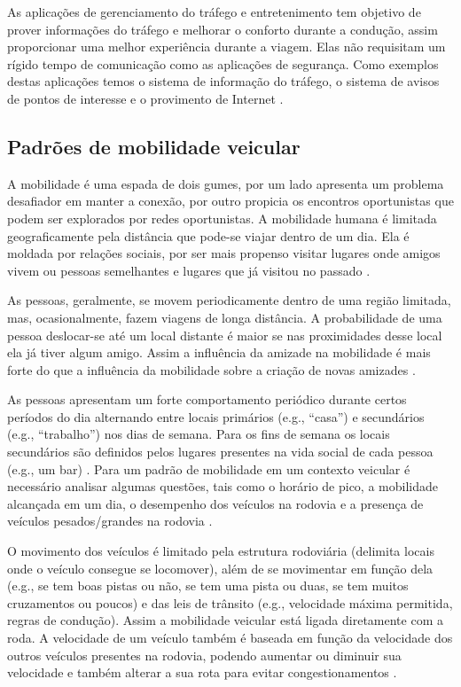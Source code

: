 \documentclass[mestrado, pre-defesa, english, brazil]{packages/icmc}
\begin{document}
As aplicações de gerenciamento do tráfego e entretenimento tem objetivo de prover informações do tráfego e melhorar o conforto durante a condução, assim proporcionar uma melhor experiência durante a viagem. Elas não requisitam um rígido tempo de comunicação como as aplicações de segurança. Como exemplos destas aplicações temos o sistema de informação do tráfego, o sistema de avisos de pontos de interesse e o provimento de Internet \cite{Soomro-2010,aboobaker-2010,Yokoyama-2014}.

\subsection{Padrões de mobilidade veicular} \label{pmv}

A mobilidade é uma espada de dois gumes, por um lado apresenta um problema desafiador em manter a conexão, por outro propicia os encontros oportunistas que podem ser explorados por redes oportunistas. A mobilidade humana é limitada geograficamente pela distância que pode-se viajar dentro de um dia. Ela é moldada por relações sociais, por ser mais propenso visitar lugares onde amigos vivem ou pessoas semelhantes e lugares que já visitou no passado \cite{Cho-2011, Hui-2005}.

As pessoas, geralmente, se movem periodicamente dentro de uma região limitada, mas, ocasionalmente, fazem viagens de longa distância. A probabilidade de uma pessoa deslocar-se até um local distante é maior se nas proximidades desse local ela já tiver algum amigo. Assim a influência da amizade na mobilidade é mais forte do que a influência da mobilidade sobre a criação de novas amizades \cite{Cho-2011}.

As pessoas apresentam um forte comportamento periódico durante certos períodos do dia alternando entre locais primários (e.g., ``casa'') e secundários (e.g., ``trabalho'') nos dias de semana. Para os fins de semana os locais secundários são definidos pelos lugares presentes na vida social de cada pessoa (e.g., um bar) \cite{Cho-2011}. Para um padrão de mobilidade em um contexto veicular é necessário analisar algumas questões, tais como o horário de pico, a mobilidade alcançada em um dia, o desempenho dos veículos na rodovia e a presença de veículos pesados/grandes na rodovia \cite{Resende-2009}.

O movimento dos veículos é limitado pela estrutura rodoviária (delimita locais onde o veículo consegue se locomover), além de se movimentar em função dela (e.g., se tem boas pistas ou não, se tem uma pista ou duas, se tem muitos cruzamentos ou poucos) e das leis de trânsito (e.g., velocidade máxima permitida, regras de condução). Assim a mobilidade veicular está ligada diretamente com a roda. A velocidade de um veículo também é baseada em função da velocidade dos outros veículos presentes na rodovia, podendo aumentar ou diminuir sua velocidade e também alterar a sua rota para evitar congestionamentos \cite{Mahajan-2006}.
\end{document}

